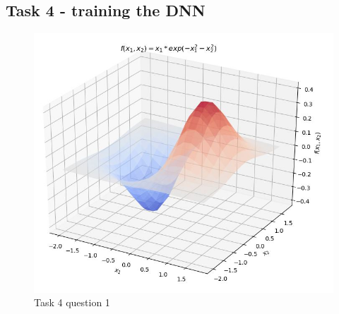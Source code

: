 \documentclass[12pt]{scrartcl}
\begin{document}
\subsection*{Task 4 - training the DNN}
\begin{figure}[ht!]
	\hfill\includegraphics[width=\linewidth]{target_fun_3d_plot.jpg}\hspace*{\fill}
	\caption{Task 4 question 1}
\end{figure}
\end{document}

